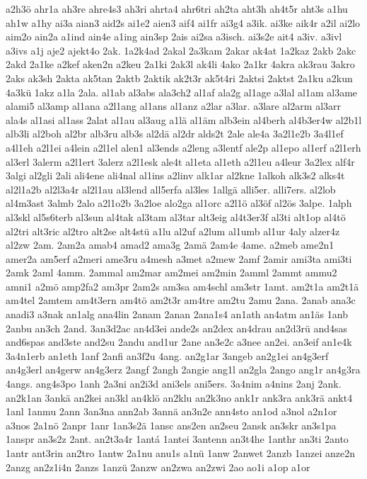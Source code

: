 {a2h3ö
ahr1a
ah3re
ahre4s3
ah3ri
ahrta4
ahr6tri
ah2ta
aht3h
ah4t5r
aht3s
a1hu
ah1w
a1hy
ai3a
aian3
aid2s
ai1e2
aien3
aif4
ai1fr
ai3g4
a3ik.
ai3ke
aik4r
a2il
ai2lo
aim2o
ain2a
a1ind
ain4e
a1ing
ain3sp
2ais
ai2sa
a3isch.
ai3s2e
ait4
a3iv.
a3ivl
a3ivs
a1j
aje2
ajekt4o
2ak.
1a2k4ad
2akal
2a3kam
2akar
ak4at
1a2kaz
2akb
2akc
2akd
2a1ke
a2kef
aken2n
a2keu
2a1ki
2ak3l
ak4li
4ako
2a1kr
4akra
ak3rau
3akro
2aks
ak3sh
2akta
ak5tan
2aktb
2aktik
ak2t3r
ak5t4ri
2aktsi
2aktst
2a1ku
a2kun
4a3kü
1akz
a1la
2ala.
al1ab
al3abs
ala3ch2
al1af
ala2g
al1age
a3lal
al1am
al3ame
alami5
al3amp
al1ana
a2l1ang
al1ans
al1anz
a2lar
a3lar.
a3lare
al2arm
al3arr
ala4s
al1asi
al1ass
2alat
al1au
al3aug
a1lä
al1äm
alb3ein
al4berh
al4b3er4w
al2b1l
alb3li
al2boh
al2br
alb3ru
alb3s
al2dä
al2dr
alds2t
2ale
ale4a
3a2l1e2b
3a4l1ef
a4l1eh
a2l1ei
a4lein
a2l1el
alen1
al3ends
a2leng
a3lentf
ale2p
al1epo
al1erf
a2l1erh
al3erl
3alerm
a2l1ert
3alerz
a2l1esk
ale4t
al1eta
al1eth
a2l1eu
a4leur
3a2lex
alf4r
3algi
al2gli
2ali
ali4ene
ali4nal
al1ins
a2linv
alk1ar
al2kne
1alkoh
alk3s2
alks4t
al2l1a2b
al2l3a4r
al2l1au
al3lend
all5erfa
al3les
1allgä
alli5er.
alli7ers.
al2lob
al4m3ast
3almb
2alo
a2l1o2b
3a2loe
alo2ga
al1orc
a2l1ö
al3öf
al2ös
3alpe.
1alph
al3skl
al5s6terb
al3sun
al4tak
al3tam
al3tar
alt3eig
al4t3er3f
al3ti
alt1op
al4tö
al2tri
alt3ric
al2tro
alt2se
alt4stü
a1lu
al2uf
a2lum
al1umb
al1ur
4aly
alzer4z
al2zw
2am.
2am2a
amab4
amad2
ama3g
2amä
2am4e
4ame.
a2meb
ame2n1
amer2a
am5erf
a2meri
ame3ru
a4mesh
a3met
a2mew
2amf
2amir
ami3ta
ami3ti
2amk
2aml
4amm.
2ammal
am2mar
am2mei
am2min
2amml
2ammt
ammu2
amni1
a2mö
amp2fa2
am3pr
2am2s
am3sa
am4schl
am3str
1amt.
am2t1a
am2t1ä
am4tel
2amtem
am4t3ern
am4tö
am2t3r
am4tre
am2tu
2amu
2ana.
2anab
ana3c
anadi3
a3nak
an1alg
ana4lin
2anam
2anan
2ana1s4
an1ath
an4atm
an1äs
1anb
2anbu
an3ch
2and.
3an3d2ac
an4d3ei
ande2s
an2dex
an4drau
an2d3rü
and4sas
and6spas
and3ste
and2su
2andu
and1ur
2ane
an3e2c
a3nee
an2ei.
an3eif
an1e4k
3a4n1erb
an1eth
1anf
2anfi
an3f2u
4ang.
an2g1ar
3angeb
an2g1ei
an4g3erf
an4g3erl
an4gerw
an4g3erz
2angf
2angh
2angie
ang1l
an2gla
2ango
ang1r
an4g3ra
4angs.
ang4s3po
1anh
2a3ni
an2i3d
ani3els
ani5ers.
3a4nim
a4nins
2anj
2ank.
an2k1an
3ankä
an2kei
an3kl
an4klö
an2klu
an2k3no
ank1r
ank3ra
ank3rä
ankt4
1anl
1anmu
2ann
3an3na
ann2ab
3annä
an3n2e
ann4sto
an1od
a3nol
a2n1or
a3nos
2a1nö
2anpr
1anr
1an3s2ä
1ansc
ans2en
an2seu
2ansk
an3skr
an3s1pa
1anspr
an3s2z
2ant.
an2t3a4r
1antá
1antei
3antenn
an3t4he
1anthr
an3ti
2anto
1antr
ant3rin
an2tro
1antw
2a1nu
anu1s
a1nü
1anw
2anwet
2anzb
1anzei
anze2n
2anzg
an2z1i4n
2anzs
1anzü
2anzw
an2zwa
an2zwi
2ao
ao1i
a1op
a1or
}
